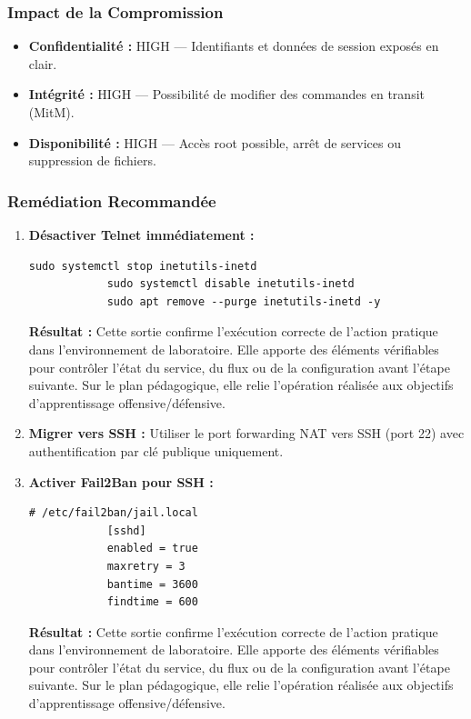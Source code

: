 \documentclass[12pt,a4paper,openany]{report}
\begin{document}
	\subsubsection{Impact de la Compromission}
	\begin{itemize}
		\item \textbf{Confidentialité :} HIGH --- Identifiants et données de session exposés en clair.
		\item \textbf{Intégrité :} HIGH --- Possibilité de modifier des commandes en transit (MitM).
		\item \textbf{Disponibilité :} HIGH --- Accès root possible, arrêt de services ou suppression de fichiers.
	\end{itemize}
	
	\subsubsection{Remédiation Recommandée}
	\begin{enumerate}
		\item \textbf{Désactiver Telnet immédiatement :}
		\begin{lstlisting}[caption=Désactivation du service Telnet]
			sudo systemctl stop inetutils-inetd
			sudo systemctl disable inetutils-inetd
			sudo apt remove --purge inetutils-inetd -y
		\end{lstlisting}
		
		\textbf{Résultat :} Cette sortie confirme l'exécution correcte de l'action pratique dans l'environnement de laboratoire. Elle apporte des éléments vérifiables pour contrôler l'état du service, du flux ou de la configuration avant l'étape suivante. Sur le plan pédagogique, elle relie l'opération réalisée aux objectifs d'apprentissage offensive/défensive.
		
		
		\item \textbf{Migrer vers SSH :} Utiliser le port forwarding NAT vers SSH (port 22) avec authentification par clé publique uniquement.
		
		\item \textbf{Activer Fail2Ban pour SSH :}
		\begin{lstlisting}[caption=Configuration Fail2Ban pour SSH]
			# /etc/fail2ban/jail.local
			[sshd]
			enabled = true
			maxretry = 3
			bantime = 3600
			findtime = 600
		\end{lstlisting}
		
		\textbf{Résultat :} Cette sortie confirme l'exécution correcte de l'action pratique dans l'environnement de laboratoire. Elle apporte des éléments vérifiables pour contrôler l'état du service, du flux ou de la configuration avant l'étape suivante. Sur le plan pédagogique, elle relie l'opération réalisée aux objectifs d'apprentissage offensive/défensive.
		
	\end{enumerate}
	
\end{document}
